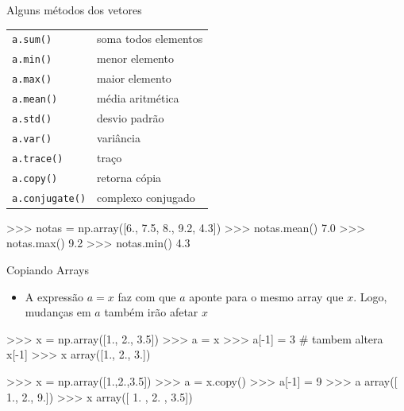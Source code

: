 \documentclass[12pt,t,graphics]{beamer}
\begin{document}
\begin{frame}[t,fragile]{Alguns métodos dos vetores}
	\begin{scriptsize}
		\begin{table}
			\centering
			\begin{tabular}[c]{|l||l|}
				\hline
				\texttt{a.sum()} & soma todos elementos \\
				\texttt{a.min()} & menor elemento\\
				\texttt{a.max()} & maior elemento\\
				\texttt{a.mean()}& média aritmética\\
				\texttt{a.std()} & desvio padrão\\
				\texttt{a.var()} & variância\\
				\texttt{a.trace()} & traço\\
				\hline
				\texttt{a.copy()} & retorna cópia\\
				\texttt{a.conjugate()} & complexo conjugado\\ 
				\hline
			\end{tabular}
		\end{table}
	\end{scriptsize}
	
	\begin{python}
	>>> notas = np.array([6., 7.5, 8., 9.2, 4.3])
	>>> notas.mean()
	7.0
	>>> notas.max()
	9.2
	>>> notas.min()
	4.3
	\end{python}
\end{frame}

\begin{frame}[t,fragile]{Copiando Arrays}
	\begin{itemize}
		\item A expressão $a = x$ faz com que $a$ aponte para 
		o mesmo array que $x$. Logo, mudanças em $a$ também 
		irão afetar $x$
	\end{itemize}
	\begin{python}
	>>> x = np.array([1., 2., 3.5])
	>>> a = x
	>>> a[-1] = 3 # tambem altera x[-1]
	>>> x
	array([1., 2., 3.])
	
	>>> x = np.array([1.,2.,3.5])
	>>> a = x.copy()
	>>> a[-1] = 9
	>>> a
	array([ 1.,  2.,  9.])
	>>> x
	array([ 1. ,  2. ,  3.5])
	\end{python}
\end{frame}
\end{document}
